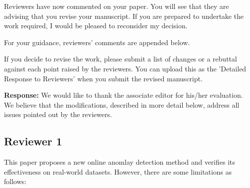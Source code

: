 \documentclass{article}
\makeatletter
\newenvironment{comment}{
\begin{sloppypar}\slshape
\vspace{5 mm}
\color{blue}
 \@beginparpenalty\@M
  \begin{list}{}{\setlength{\topsep}{0ex}%
  \setlength{\leftmargin}{\rightmargin}}\item[]
 \@beginparpenalty\@endparpenalty
}
{\end{list}
\end{sloppypar}
}
\makeatother
\begin{document}
\begin{comment}
Reviewers have now commented on your paper. You will see that they are advising that you revise your manuscript. If you are prepared to undertake the work required, I would be pleased to reconsider my decision.

For your guidance, reviewers' comments are appended below.

If you decide to revise the work, please submit a list of changes or a rebuttal against each point raised by the reviewers. You can upload this as the 'Detailed Response to Reviewers' when you submit the revised manuscript.
\end{comment}
{\bf Response:}
We would like to thank the associate editor for his/her evaluation. We
believe that the modifications, described in more detail below,
address all issues pointed out by the reviewers.

\subsection*{Reviewer 1}
\begin{comment}
This paper proposes a new online anomlay detection method and verifies its effectiveness on real-world datasets. However, there are some limitations as follows:
\end{comment}
\end{document}
